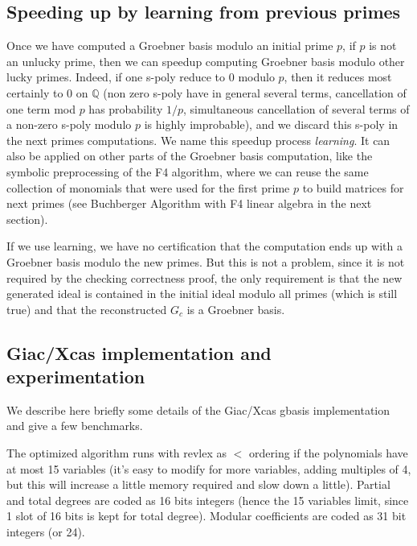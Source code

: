 \documentclass[a4paper,11pt]{article}
\begin{document}
\begin{giacjshere}
\subsection{Speeding up by learning from previous primes} \label{sec:learning}
Once we have computed a Groebner basis modulo an initial prime $p$, if $p$ is
not an unlucky prime, then we can speedup computing Groebner basis
modulo other lucky primes. Indeed, if one s-poly reduce to 0 modulo
$p$, then it reduces most certainly to 0 on $\mathbb{Q}$ (non zero s-poly have
in general several terms, cancellation of one term mod $p$ has
probability $1/p$, simultaneous cancellation of several terms of a non-zero
s-poly modulo $p$ is highly improbable), and we discard this s-poly in the
next primes computations. We name this speedup process {\em learning}. 
It can also
be applied on other parts of the Groebner basis computation, like the
symbolic preprocessing of the F4 algorithm, where we can reuse the
same collection of monomials that were used for the first prime $p$ 
to build matrices for next primes (see Buchberger Algorithm with F4 
linear algebra in the next section).

If we use learning, we have no certification that the computation ends up
with a Groebner basis modulo the new primes. But this is not a problem,
since it is not required by the checking correctness proof, the only
requirement is that the new generated ideal is contained in the
initial ideal modulo all primes (which is still true) and 
that the reconstructed $G_c$ is a Groebner basis.

\subsection{Giac/Xcas implementation and experimentation} \label{sec:giacf4}
We describe here briefly some details of the Giac/Xcas gbasis implementation
and give a few benchmarks.

The optimized algorithm runs with revlex as $<$ ordering
if the polynomials have at most 15
variables (it's easy to modify for more variables, adding multiples of
4, but this will increase a little memory required and
slow down a little).
Partial and total degrees are coded as 16 bits integers (hence the 15
variables limit, since 1 slot of 16 bits is kept for total degree). 
Modular coefficients are coded as 31 bit integers (or 24).


\end{giacjshere}
\end{document}
